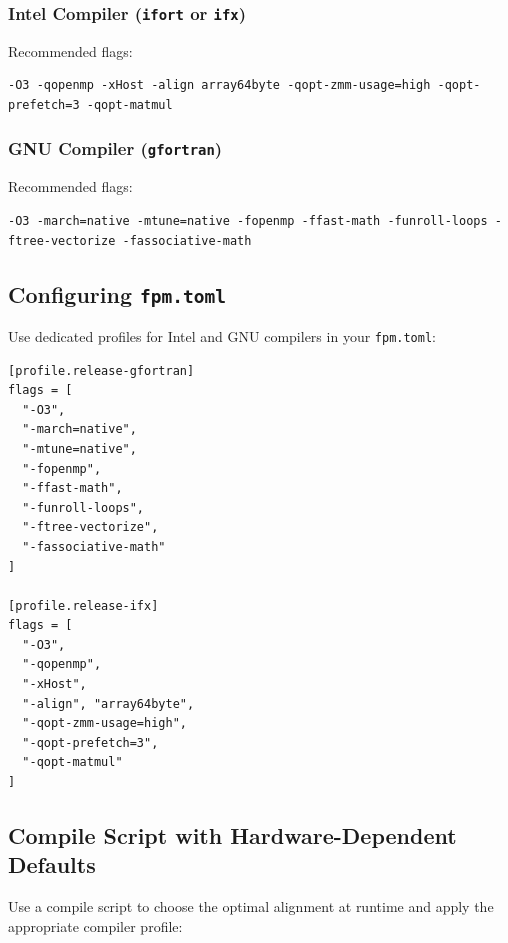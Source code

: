 \documentclass{article}
\begin{document}
\subsubsection{Intel Compiler (\texttt{ifort} or \texttt{ifx})}
\label{intel_flags}
Recommended flags:
\begin{verbatim}
-O3 -qopenmp -xHost -align array64byte -qopt-zmm-usage=high -qopt-prefetch=3 -qopt-matmul
\end{verbatim}

\subsubsection{GNU Compiler (\texttt{gfortran})}
\label{gfortran_flags}
Recommended flags:
\begin{verbatim}
-O3 -march=native -mtune=native -fopenmp -ffast-math -funroll-loops -ftree-vectorize -fassociative-math
\end{verbatim}

\subsection{Configuring \texttt{fpm.toml}}
Use dedicated profiles for Intel and GNU compilers in your \texttt{fpm.toml}:

\begin{verbatim}
[profile.release-gfortran]
flags = [
  "-O3",
  "-march=native",
  "-mtune=native",
  "-fopenmp",
  "-ffast-math",
  "-funroll-loops",
  "-ftree-vectorize",
  "-fassociative-math"
]

[profile.release-ifx]
flags = [
  "-O3",
  "-qopenmp",
  "-xHost",
  "-align", "array64byte",
  "-qopt-zmm-usage=high",
  "-qopt-prefetch=3",
  "-qopt-matmul"
]
\end{verbatim}

\subsection{Compile Script with Hardware-Dependent Defaults}
Use a compile script to choose the optimal alignment at runtime and apply the appropriate compiler profile:
\end{document}
